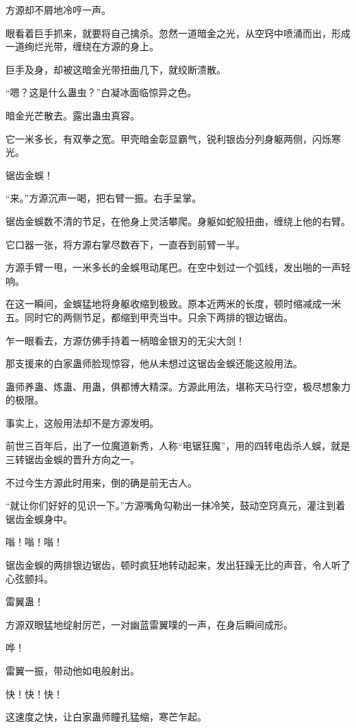 \begin{this_body}
方源却不屑地冷哼一声。

眼看着巨手抓来，就要将自己擒杀。忽然一道暗金之光，从空窍中喷涌而出，形成一道绚烂光带，缠绕在方源的身上。

巨手及身，却被这暗金光带扭曲几下，就绞断溃散。

“嗯？这是什么蛊虫？”白凝冰面临惊异之色。

暗金光芒散去。露出蛊虫真容。

它一米多长，有双拳之宽。甲壳暗金彰显霸气，锐利银齿分列身躯两侧，闪烁寒光。

锯齿金蜈！

“来。”方源沉声一喝，把右臂一振。右手呈掌。

锯齿金蜈数不清的节足，在他身上灵活攀爬。身躯如蛇般扭曲，缠绕上他的右臂。

它口器一张，将方源右掌尽数吞下，一直吞到前臂一半。

方源手臂一甩，一米多长的金蜈甩动尾巴。在空中划过一个弧线，发出啪的一声轻响。

在这一瞬间，金蜈猛地将身躯收缩到极致。原本近两米的长度，顿时缩减成一米五。同时它的两侧节足，都缩到甲壳当中。只余下两排的银边锯齿。

乍一眼看去，方源仿佛手持着一柄暗金银刃的无尖大剑！

那支援来的白家蛊师脸现惊容，他从未想过这锯齿金蜈还能这般用法。

蛊师养蛊、炼蛊、用蛊，俱都博大精深。方源此用法，堪称天马行空，极尽想象力的极限。

事实上，这般用法却不是方源发明。

前世三百年后，出了一位魔道新秀，人称“电锯狂魔”，用的四转电齿杀人蜈，就是三转锯齿金蜈的晋升方向之一。

不过今生方源此时用来，倒的确是前无古人。

“就让你们好好的见识一下。”方源嘴角勾勒出一抹冷笑，鼓动空窍真元，灌注到着锯齿金蜈身中。

嗡！嗡！嗡！

锯齿金蜈的两排银边锯齿，顿时疯狂地转动起来，发出狂躁无比的声音，令人听了心弦颤抖。

雷翼蛊！

方源双眼猛地绽射厉芒，一对幽蓝雷翼噗的一声，在身后瞬间成形。

哗！

雷翼一振，带动他如电般射出。

快！快！快！

这速度之快，让白家蛊师瞳孔猛缩，寒芒乍起。


\end{this_body}
